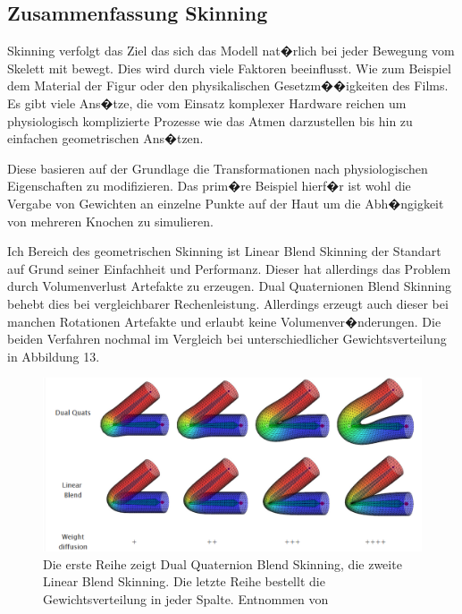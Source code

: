 \subsection{Zusammenfassung Skinning}

Skinning verfolgt das Ziel das sich das Modell nat�rlich bei jeder Bewegung vom Skelett mit bewegt. Dies wird durch viele Faktoren beeinflusst. Wie zum Beispiel dem Material der Figur oder den physikalischen Gesetzm��igkeiten des Films. Es gibt viele Ans�tze, die vom Einsatz komplexer Hardware reichen um physiologisch komplizierte Prozesse wie das Atmen darzustellen bis hin zu einfachen geometrischen Ans�tzen. 

Diese basieren auf der Grundlage die Transformationen nach physiologischen Eigenschaften zu modifizieren. Das prim�re Beispiel hierf�r ist wohl die Vergabe von Gewichten an einzelne Punkte auf der Haut um die Abh�ngigkeit von mehreren Knochen zu simulieren. 

Ich Bereich des geometrischen Skinning ist Linear Blend Skinning der Standart auf Grund seiner Einfachheit und Performanz. Dieser hat allerdings das Problem durch Volumenverlust Artefakte zu erzeugen. Dual Quaternionen Blend Skinning behebt dies bei vergleichbarer Rechenleistung. Allerdings erzeugt auch dieser bei manchen Rotationen Artefakte und erlaubt keine Volumenver�nderungen. Die beiden Verfahren nochmal im Vergleich bei unterschiedlicher Gewichtsverteilung in Abbildung 13.

\begin{figure}[t]
	\includegraphics[width=13cm]{01_Skinning/pics/lbsvsdqs.png}
	\caption[Geometrisches Skinning im Vergleich]{Die erste Reihe zeigt Dual Quaternion Blend Skinning, die zweite Linear Blend Skinning. Die letzte Reihe bestellt die Gewichtsverteilung in jeder Spalte. Entnommen von \cite{weights}}
	\label{weights_fig1}
\end{figure}